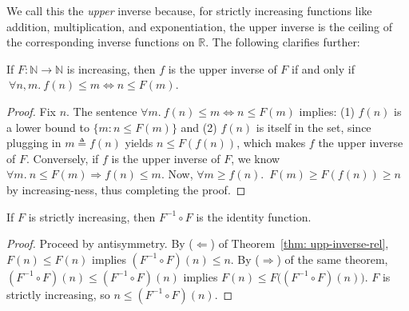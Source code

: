 We call this the \emph{upper} inverse because, for strictly increasing functions like
addition, multiplication, and exponentiation, the upper inverse is the ceiling of the
corresponding inverse functions on $\mathbb{R}$. The following clarifies further:
\begin{thm} \label{thm: upp-inverse-rel}
	\href{https://github.com/inv-ack/inv-ack/blob/7270e64a2600b771f2b1b1b151f7d13fb2ae6c97/inverse.v#L65-L77}{\coq} If $F:\mathbb{N}\to \mathbb{N}$ is increasing, then $f$ is the upper inverse of $F$ if and only if $\ \forall n, m.~ f(n)\le m \iff n \le F(m)$.
\end{thm}
\begin{proof}
Fix $n$. The sentence $\forall m.~ f(n)\le m \iff n\le F(m)$ implies: (1) $f(n)$ is a lower bound to $\{m: n \le F(m)\}$ and (2) $f(n)$ is itself in the set, since plugging in $m \triangleq f(n)$ yields $n\le F(f(n))$, which makes $f$ the upper inverse of $F$. Conversely, if $f$ is the upper inverse of $F$, we know $\forall m.~n\le F(m)\Rightarrow f(n)\le m$. Now, $\forall m \ge f(n)$.~$F(m)\ge F(f(n)) \ge n$ by increasing-ness, thus completing the proof.
\end{proof}
\begin{col}\label{col:inv_gives_id}
\href{https://github.com/inv-ack/inv-ack/blob/7270e64a2600b771f2b1b1b151f7d13fb2ae6c97/inverse.v#L79-L90}{\coq}
If $F$ is strictly increasing, then $F^{-1} \circ F$ is
the identity function.
\end{col}
\begin{proof}
Proceed by antisymmetry. By ($\Leftarrow$) of Theorem~\ref{thm: upp-inverse-rel}, $F(n) \le F(n)$ implies
$(F^{-1} \circ F)(n) \le n$.  By ($\Rightarrow$) of the same theorem, $(F^{-1} \circ F)(n) \le (F^{-1} \circ F)(n)$ implies $F(n) \le F \big((F^{-1} \circ F)(n)\big)$. $F$ is strictly increasing, so $n \le (F^{-1} \circ F)(n)$.
\end{proof}

